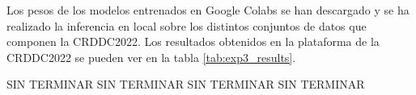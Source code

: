 Los pesos de los modelos entrenados en Google Colabs se han descargado y se ha realizado la inferencia en local sobre los distintos conjuntos de datos que componen la CRDDC2022. Los resultados obtenidos en la plataforma de la CRDDC2022 se pueden ver en la tabla \ref{tab:exp3_results}.

\begin{table}[H]
    \centering
    \caption{F1-scores obtenidos en la plataforma de la CRDDC2022 para los distintos conjuntos de datos.}
    \label{tab:exp3_results}
\end{table}

SIN TERMINAR
SIN TERMINAR
SIN TERMINAR
SIN TERMINAR